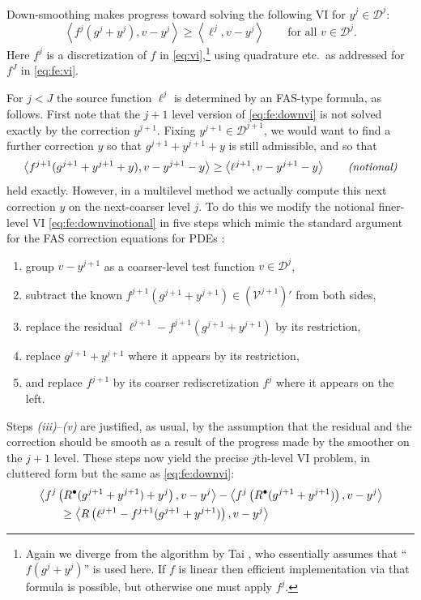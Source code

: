 \documentclass[letterpaper,final,12pt,reqno]{amsart}
\theoremstyle{cstyle}
\theoremstyle{cstyle*}
\theoremstyle{dstyle}
\numberwithin{equation}{section}
\numberwithin{figure}{section}
\numberwithin{table}{section}
\numberwithin{theorem}{section}
\newcommand{\ip}[2]{\left<#1,#2\right>}
\newcommand{\iR}{R^{\bullet}}
\begin{document}
Down-smoothing makes progress toward solving the following VI for $y^j \in \mathcal{D}^j$:
\begin{equation}
\ip{f^j(g^j + y^j)}{v-y^j} \ge \ip{\ell^j}{v-y^j} \qquad \text{for all } v\in \mathcal{D}^j. \label{eq:fe:downvi}
\end{equation}
Here $f^j$ is a discretization of $f$ in \eqref{eq:vi},\footnote{Again we diverge from the algorithm by Tai \cite{Tai2003}, who essentially assumes that ``$f(g^j + y^j)$'' is used here.  If $f$ is linear then efficient implementation via that formula is possible, but otherwise one must apply $f^j$.} using quadrature etc.~as addressed for $f^J$ in \eqref{eq:fe:vi}.

For $j<J$ the source function $\ell^j$ is determined by an FAS-type formula, as follows.  First note that the $j+1$ level version of \eqref{eq:fe:downvi} is not solved exactly by the correction $y^{j+1}$.  Fixing $y^{j+1} \in \mathcal{D}^{j+1}$, we would want to find a further correction $y$ so that $g^{j+1}+y^{j+1}+y$ is still admissible, and so that
\begin{equation}
\ip{f^{j+1}(g^{j+1}+y^{j+1}+y)}{v-y^{j+1}-y} \ge \ip{\ell^{j+1}}{v-y^{j+1}-y} \qquad \text{\emph{(notional)}} \label{eq:fe:downvinotional}
\end{equation}
held exactly.  However, in a multilevel method we actually compute this next correction $y$ on the next-coarser level $j$.  To do this we modify the notional finer-level VI \eqref{eq:fe:downvinotional} in five steps which mimic the standard argument for the FAS correction equations for PDEs \cite{BrandtLivne2011,Trottenbergetal2001}:
\begin{enumerate}
\item group $v-y^{j+1}$ as a coarser-level test function $v\in \mathcal{D}^j$,
\item subtract the known $f^{j+1}(g^{j+1}+y^{j+1}) \in (\mathcal{V}^{j+1})'$ from both sides,
\item replace the residual $\ell^{j+1}-f^{j+1}(g^{j+1}+y^{j+1})$ by its restriction,
\item replace $g^{j+1}+y^{j+1}$ where it appears by its restriction,
\item and replace $f^{j+1}$ by its coarser rediscretization $f^j$ where it appears on the left.
\end{enumerate}
Steps \emph{(iii)}--\emph{(v)} are justified, as usual, by the assumption that the residual and the correction should be smooth as a result of the progress made by the smoother on the $j+1$ level.  These steps now yield the precise $j$th-level VI problem, in cluttered form but the same as \eqref{eq:fe:downvi}:
\begin{align}
&\ip{f^j\left(\iR(g^{j+1}+y^{j+1})+y^j\right)}{v-y^j} - \ip{f^j\left(\iR(g^{j+1}+y^{j+1})\right)}{v-y^j} \label{eq:fe:downvicluttered} \\
&\qquad \ge \ip{R\left(\ell^{j+1}-f^{j+1}(g^{j+1}+y^{j+1})\right)}{v-y^j} \notag
\end{align}
\end{document}
